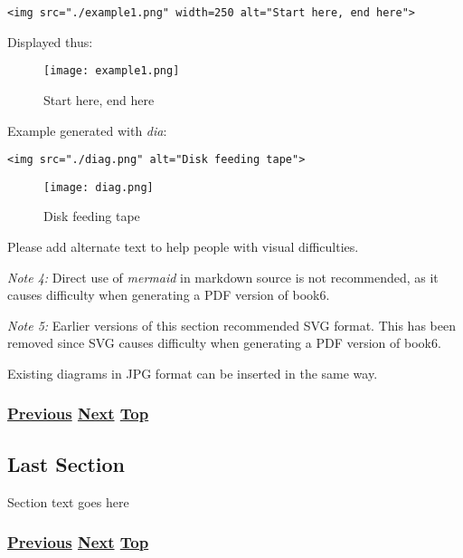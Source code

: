 \documentclass[
]{article}
\begin{document}
\begin{verbatim}
<img src="./example1.png" width=250 alt="Start here, end here">
\end{verbatim}

Displayed thus:

\begin{figure}
\centering
\texttt{[image: example1.png]}
\caption{Start here, end here}
\end{figure}

Example generated with \emph{dia}:

\begin{verbatim}
<img src="./diag.png" alt="Disk feeding tape">
\end{verbatim}

\begin{figure}
\centering
\texttt{[image: diag.png]}
\caption{Disk feeding tape}
\end{figure}

Please add alternate text to help people with visual difficulties.

\emph{Note 4:} Direct use of \emph{mermaid} in markdown source is not
recommended, as it causes difficulty when generating a PDF version of
book6.

\emph{Note 5:} Earlier versions of this section recommended SVG format.
This has been removed since SVG causes difficulty when generating a PDF
version of book6.

Existing diagrams in JPG format can be inserted in the same way.

\subsubsection{\texorpdfstring{\hyperref[section-template]{Previous}
\hyperref[last-section]{Next}
\hyperref[chapter-template]{Top}}{Previous Next Top}}\label{previous-next-top-40}

\pagebreak

\subsection{Last Section}\label{last-section}

Section text goes here

\subsubsection{\texorpdfstring{\hyperref[markdown-usage]{Previous}
\hyperref[chapter-template]{Next}
\hyperref[chapter-template]{Top}}{Previous Next Top}}\label{previous-next-top-41}
\end{document}
